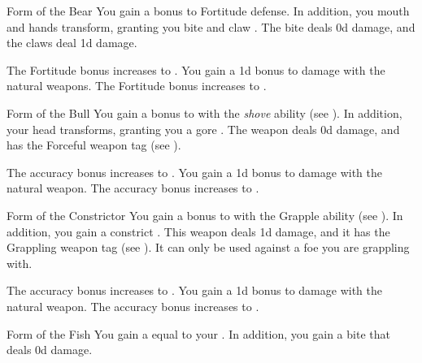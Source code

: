         {
            \begin{freeability}{Form of the Bear}
                You gain a  bonus to Fortitude defense.
                In addition, you mouth and hands transform, granting you bite and claw .
                The bite deals \plus0d damage, and the claws deal \minus1d damage.

                \rankline
                 The Fortitude bonus increases to .
                 You gain a \plus1d bonus to damage with the natural weapons.
                 The Fortitude bonus increases to .
            \end{freeability}

            \begin{freeability}{Form of the Bull}
                You gain a  bonus to  with the \textit{shove} ability (see ).
                In addition, your head transforms, granting you a gore .
                The weapon deals \plus0d damage, and has the Forceful weapon tag (see ).

                \rankline
                 The accuracy bonus increases to .
                 You gain a \plus1d bonus to damage with the natural weapon.
                 The accuracy bonus increases to .
            \end{freeability}

            \begin{freeability}{Form of the Constrictor}
                You gain a  bonus to  with the Grapple ability (see ).
                In addition, you gain a constrict .
                This weapon deals \plus1d damage, and it has the Grappling weapon tag (see ).
                It can only be used against a foe you are grappling with.

                \rankline
                 The accuracy bonus increases to .
                 You gain a \plus1d bonus to damage with the natural weapon.
                 The accuracy bonus increases to .
            \end{freeability}

            \begin{freeability}{Form of the Fish}
                You gain a  equal to your .
                In addition, you gain a bite  that deals \plus0d damage.


\end{freeability}}
